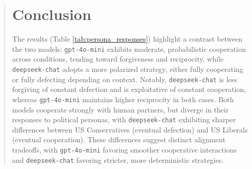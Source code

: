 \documentclass[%
 reprint,
 amsmath,amssymb,
 aps,
]{revtex4-2}
\begin{document}
\begin{abstract}

\section{Conclusion}
 The results (Table \ref{tab:persona_responses}) highlight a contrast between the two models: \texttt{gpt-4o-mini} exhibits moderate, probabilistic cooperation across conditions, tending toward forgiveness and reciprocity, while \texttt{deepseek-chat} adopts a more polarized strategy, either fully cooperating or fully defecting depending on context. Notably, \texttt{deepseek-chat} is less forgiving of constant defection and is exploitative of constant cooperation, whereas \texttt{gpt-4o-mini} maintains higher reciprocity in both cases. Both models cooperate strongly with human partners, but diverge in their responses to political personas, with \texttt{deepseek-chat} exhibiting sharper differences between US Conservatives (eventual defection) and US Liberals (eventual cooperation). These differences suggest distinct alignment tradeoffs, with \texttt{gpt-4o-mini} favoring smoother cooperative interactions and \texttt{deepseek-chat} favoring stricter, more deterministic strategies.







\end{abstract}
\end{document}
